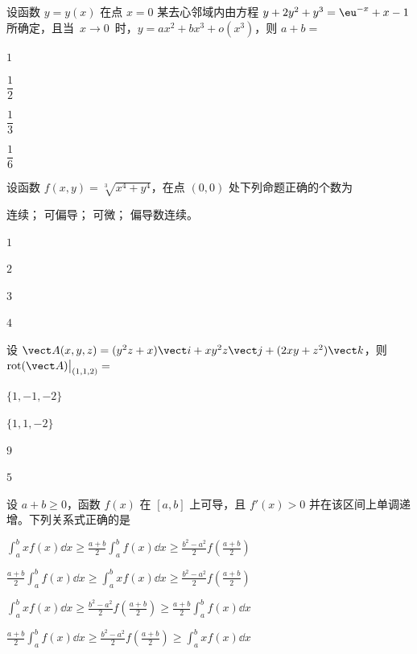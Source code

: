 
\begin{question}[index=1]
设函数 $y=y(x)$ 在点 $x=0$ 某去心邻域内由方程 $y+2y^2+y^3=\eu^{-x}+x-1$ 所确定，\allowbreak\mbox{且当 $x\to0$ 时}，$y=ax^2+bx^3+o(x^3)$，则 $a+b=$
\begin{choices}[columns=4]
\item $1$
\item $\dfrac12$
\item $\dfrac13$
\item $\dfrac16$
\end{choices}
\end{question}
\QuestionBreak

\begin{question}[index=2]
设函数 $f(x,y)=\sqrt[3]{x^4+y^4}$，在点 $(0,0)$ 处下列命题正确的个数为
\par{} 连续；\quad{} 可偏导；\quad{} 可微；\quad{} 偏导数连续。
\begin{choices}[columns=4]
\item $1$
\item $2$
\item $3$
\item $4$
\end{choices}
\end{question}
\QuestionBreak

\begin{question}[index=3]
设 $\vect A(x,y,z)=(y^2z+x)\vect i+xy^2z\vect j+(2xy+z^2)\vect k$，则
$\operatorname{rot}(\vect A)\big|_{(1,1,2)}=$
\begin{choices}[columns=4]
\item $\{1,-1,-2\}$
\item $\{1,1,-2\}$
\item $9$
\item $5$
\end{choices}
\end{question}
\QuestionBreak

\begin{question}[index=4]
设 $a+b\ge0$，函数 $f(x)$ 在 $[a,b]$ 上可导，且 $f'(x)>0$ 并在该区间上单调递增。下列关系式正确的是
\begin{choices}[columns=1]
\item $\displaystyle\int_a^b xf(x)\dd x\ge\frac{a+b}{2}\int_a^b f(x)\dd x\ge\frac{b^2-a^2}{2}f\!\left(\frac{a+b}{2}\right)$
\item $\displaystyle\frac{a+b}{2}\int_a^b f(x)\dd x\ge\int_a^b xf(x)\dd x\ge\frac{b^2-a^2}{2}f\!\left(\frac{a+b}{2}\right)$
\item $\displaystyle\int_a^b xf(x)\dd x\ge\frac{b^2-a^2}{2}f\!\left(\frac{a+b}{2}\right)\ge\frac{a+b}{2}\int_a^b f(x)\dd x$
\item $\displaystyle\frac{a+b}{2}\int_a^b f(x)\dd x\ge\frac{b^2-a^2}{2}f\!\left(\frac{a+b}{2}\right)\ge\int_a^b xf(x)\dd x$
\end{choices}
\end{question}
\QuestionBreak

